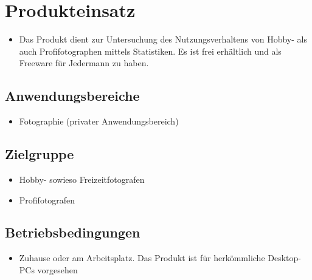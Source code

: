 \section{Produkteinsatz}
  \begin{itemize}
  \item Das Produkt dient zur Untersuchung des Nutzungsverhaltens von Hobby- als auch Profifotographen mittels Statistiken. Es ist frei erhältlich und als Freeware für Jedermann zu haben.
  \end{itemize}
\subsection{Anwendungsbereiche}
  \begin{itemize}
  \item Fotographie (privater Anwendungsbereich) 
  \end{itemize}

\subsection{Zielgruppe}
	\begin{itemize}
		\item Hobby- sowieso Freizeitfotografen
		\item Profifotografen		
	\end{itemize}

\subsection{Betriebsbedingungen}
  \begin{itemize}
  		\item Zuhause oder am Arbeitsplatz. Das Produkt ist für herkömmliche Desktop-PCs vorgesehen
  \end{itemize}
